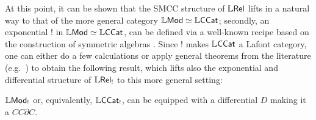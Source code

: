 \documentclass[submission,%
]{eptcs}
\begin{document}
At this point, it can be shown that the SMCC structure of $\mathbb{L} \mathsf{Rel}$ lifts in a natural way to that of the more general category $\mathbb{L}\mathsf{Mod}\simeq\mathbb{L}\mathsf{CCat}$; secondly, an exponential $!$ in $\mathbb{L}\mathsf{Mod}\simeq\mathbb{L}\mathsf{CCat}$, can be defined via a well-known recipe  based on the construction of symmetric algebras \cite{Mellies2018, Manzo2013, Laird2020} .
Since $!$ makes $\mathbb{L}\mathsf{CCat}$ a Lafont category, one can either do a few calculations or apply general theorems from the literature (e.g.~\cite{LemayCALCO2021}) to obtain the following result, which lifts also the exponential and differential structure of $\mathbb{L} \mathsf{Rel}_{!}$ to this more general setting:
%
\begin{theorem}\label{thm:no-base}
$\mathbb{L}\mathsf{Mod}_{!}$ or, equivalently, $\mathbb{L}\mathsf{CCat}_{!}$, can be equipped with a differential $D$ making it a $CC\partial C$. 
\end{theorem}



\end{document}
